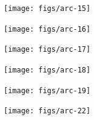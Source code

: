 \documentclass[landscape]{slides}
\begin{document}
\begin{slide}\begin{center}\texttt{[image: figs/arc-15]}\end{center}\vfill\end{slide}
\begin{slide}\begin{center}\texttt{[image: figs/arc-16]}\end{center}\vfill\end{slide}
\begin{slide}\begin{center}\texttt{[image: figs/arc-17]}\end{center}\vfill\end{slide}
\begin{slide}\begin{center}\texttt{[image: figs/arc-18]}\end{center}\vfill\end{slide}
\begin{slide}\begin{center}\texttt{[image: figs/arc-19]}\end{center}\vfill\end{slide}
\begin{slide}\begin{center}\texttt{[image: figs/arc-22]}\end{center}\vfill\end{slide}
\end{document}
